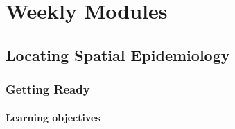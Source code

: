 \documentclass[
]{book}
\begin{document}
\hypertarget{part-weekly-modules}{%
\part{Weekly Modules}\label{part-weekly-modules}}

\hypertarget{locating-spatial-epidemiology}{%
\chapter{Locating Spatial Epidemiology}\label{locating-spatial-epidemiology}}

\hypertarget{getting-ready}{%
\section{Getting Ready}\label{getting-ready}}

\hypertarget{learning-objectives}{%
\subsection{Learning objectives}\label{learning-objectives}}

 
  \providecommand{\huxb}[2]{\arrayrulecolor[RGB]{#1}\global\arrayrulewidth=#2pt}
  \providecommand{\huxvb}[2]{\color[RGB]{#1}\vrule width #2pt}
  \providecommand{\huxtpad}[1]{\rule{0pt}{#1}}
  \providecommand{\huxbpad}[1]{\rule[-#1]{0pt}{#1}}
\end{document}

